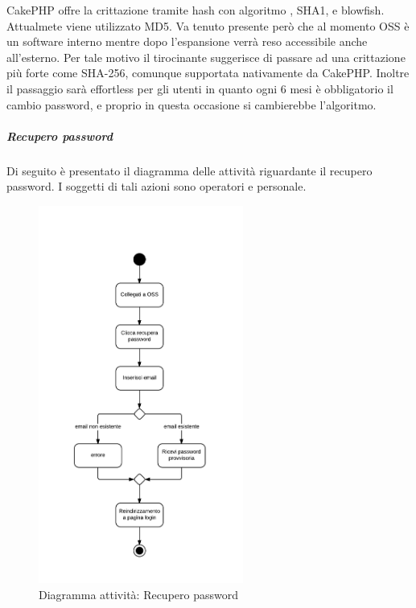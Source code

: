 \label{hash} CakePHP offre la crittazione tramite hash con algoritmo , SHA1,  e blowfish. Attualmete viene utilizzato MD5. Va tenuto presente però che al momento OSS è un software interno mentre dopo l'espansione verrà reso accessibile anche all'esterno. Per tale motivo il tirocinante suggerisce di passare ad una crittazione più forte come SHA-256, comunque supportata nativamente da CakePHP. Inoltre il passaggio sarà effortless per gli utenti in quanto ogni 6 mesi è obbligatorio il cambio password, e proprio in questa occasione si cambierebbe l'algoritmo.


\subparagraph{Recupero password}
Di seguito è presentato il diagramma delle attività riguardante il recupero password. I soggetti di tali azioni sono operatori e personale.\\


\begin{figure}[H]
\centering
\includegraphics[width=0.6\textwidth]{images/user_rcvpsw.png}
\caption{Diagramma attività: Recupero password}
\end{figure}


